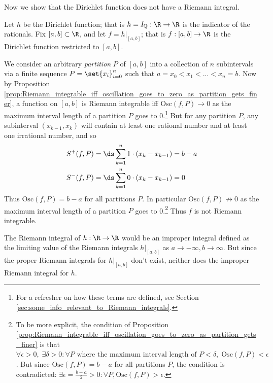 \documentclass{article} %
\renewcommand{\Q}{\mathbb{Q}}
\begin{document}
Now we show that the Dirichlet function does not have a Riemann integral. 

\begin{remark}{}	
Let $h$ be the Dirichlet function; that is $h = I_{\Q} : \R \to \R$ is the indicator of the rationals.  Fix $[a,b] \subset \R$, and let $f=h |_{[a,b]}$; that is $f : [a,b] \to \R$ is the Dirichlet function restricted to $[a,b]$.  

We consider an arbitrary \textit{partition} $P$ of $[a,b]$ into a collection of $n$ subintervals via a finite sequence $P=\set{x_i}_{i=0}^n$ such that $a=x_0 < x_1 < ... < x_n = b$.  Now by Proposition \ref{prop:Riemann_integrable_iff_oscillation_goes_to_zero_as_partition_gets_finer}, a function on $[a,b]$ is Riemann integrable iff $\text{Osc}(f,P) \to 0$ as the maximum interval length of a partition $P$ goes to 0.\footnote{For a refresher on how these terms are defined, see Section \ref{sec:some_info_relevant_to_Riemann_integrals}.}  But for any partition $P$, any subinterval $(x_{k-1}, x_k)$ will contain at least one rational number and at least one irrational number, and so
\begin{align*}
S^+(f,P) &= \ds\sum_{k=1}^n 1 \cdot (x_k - x_{k-1}) = b-a \\	
S^-(f,P) &= \ds\sum_{k=1}^n 0 \cdot (x_k - x_{k-1}) = 0\\
\end{align*}
Thus $\text{Osc}(f,P) = b-a$ for all partitions $P$. In particular $\text{Osc}(f,P) \not\to 0$ 	as the maximum interval length of a partition $P$ goes to 0.\footnote{To be more explicit, the condition of Proposition \ref{prop:Riemann_integrable_iff_oscillation_goes_to_zero_as_partition_gets_finer} is that $\forall \epsilon > 0, \;\exists \delta >0  : \forall P  \text{ where the maximum interval length of } P < \delta, \; \text{Osc}(f,P) < \epsilon$. But since $\text{Osc}(f,P) = b-a$ for all partitions $P$, the condition is contradicted: $\exists \epsilon = \frac{b-a}{2} >0 : \forall P, \text{Osc}(f,P) > \epsilon.$}  Thus $f$ is not Riemann integrable. 

The Riemann integral of $h: \R \to \R$ would be an improper integral defined as the limiting value of the Riemann integrals $h|_{[a,b]}$ as $a \to -\infty, b \to \infty$.  But since the proper Riemann integrals for $h|_{[a,b]}$ don't exist, neither does the improper Riemann integral for $h$. 
\label{rk:dirichlet_function_is_not_Riemann_integrable}
\end{remark}
\end{document}
